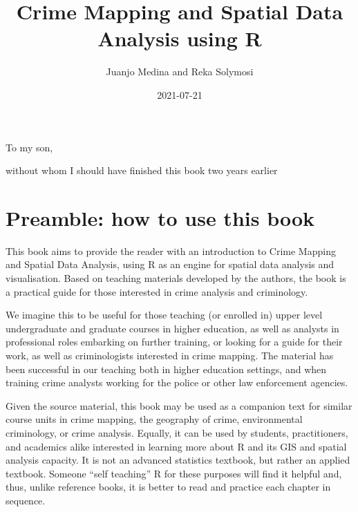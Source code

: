 \documentclass[
  krantz2]{krantz}
\title{Crime Mapping and Spatial Data Analysis using R}
\author{Juanjo Medina and Reka Solymosi}
\date{2021-07-21}
\begin{document}
\maketitle


\thispagestyle{empty}

\begin{center}
To my son,

without whom I should have finished this book two years earlier
\end{center}

\setlength{\abovedisplayskip}{-5pt}
\setlength{\abovedisplayshortskip}{-5pt}

{
\hypersetup{linkcolor=}
\setcounter{tocdepth}{2}
\tableofcontents
}
\listoftables
\listoffigures
\hypertarget{preamble-how-to-use-this-book}{%
\chapter{Preamble: how to use this book}\label{preamble-how-to-use-this-book}}

This book aims to provide the reader with an introduction to Crime Mapping and Spatial Data Analysis, using R as an engine for spatial data analysis and visualisation. Based on teaching materials developed by the authors, the book is a practical guide for those interested in crime analysis and criminology.

We imagine this to be useful for those teaching (or enrolled in) upper level undergraduate and graduate courses in higher education, as well as analysts in professional roles embarking on further training, or looking for a guide for their work, as well as criminologists interested in crime mapping. The material has been successful in our teaching both in higher education settings, and when training crime analysts working for the police or other law enforcement agencies.

Given the source material, this book may be used as a companion text for similar course units in crime mapping, the geography of crime, environmental criminology, or crime analysis. Equally, it can be used by students, practitioners, and academics alike interested in learning more about R and its GIS and spatial analysis capacity. It is not an advanced statistics textbook, but rather an applied textbook. Someone ``self teaching'' R for these purposes will find it helpful and, thus, unlike reference books, it is better to read and practice each chapter in sequence.
\end{document}
